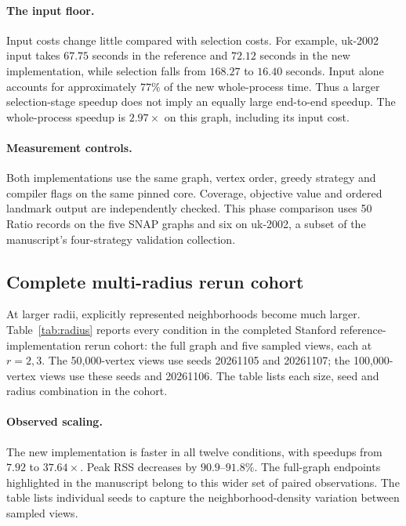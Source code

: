 \paragraph{The input floor.}
Input costs change little compared with selection costs. For example, uk-2002 input takes $67.75$ seconds in the reference and $72.12$ seconds in the new implementation, while selection falls from $168.27$ to $16.40$ seconds. Input alone accounts for approximately $77\%$ of the new whole-process time. Thus a larger selection-stage speedup does not imply an equally large end-to-end speedup. The whole-process speedup is $2.97\times$ on this graph, including its input cost.

\paragraph{Measurement controls.}
Both implementations use the same graph, vertex order, greedy strategy and compiler flags on the same pinned core. Coverage, objective value and ordered landmark output are independently checked. This phase comparison uses 50 Ratio records on the five SNAP graphs and six on uk-2002, a subset of the manuscript's four-strategy validation collection.

\clearpage
\subsection{Complete multi-radius rerun cohort}
At larger radii, explicitly represented neighborhoods become much larger. Table~\ref{tab:radius} reports every condition in the completed Stanford reference-implementation rerun cohort: the full graph and five sampled views, each at $r=2,3$. The 50,000-vertex views use seeds 20261105 and 20261107; the 100,000-vertex views use these seeds and 20261106. The table lists each size, seed and radius combination in the cohort.

\begin{table}[H]
\centering\smalltablefont\setlength{\tabcolsep}{4pt}
\caption{All twelve multi-radius conditions. Entries are three-run medians. View seed suffixes 05/06/07 denote 20261105/06/07. Speedup is old/new whole-process time; saved memory is $100(1-\mathrm{new}/\mathrm{old})$.}
\label{tab:radius}

\end{table}

\paragraph{Observed scaling.}
The new implementation is faster in all twelve conditions, with speedups from $7.92$ to $37.64\times$. Peak RSS decreases by $90.9$--$91.8\%$. The full-graph endpoints highlighted in the manuscript belong to this wider set of paired observations. The table lists individual seeds to capture the neighborhood-density variation between sampled views.

